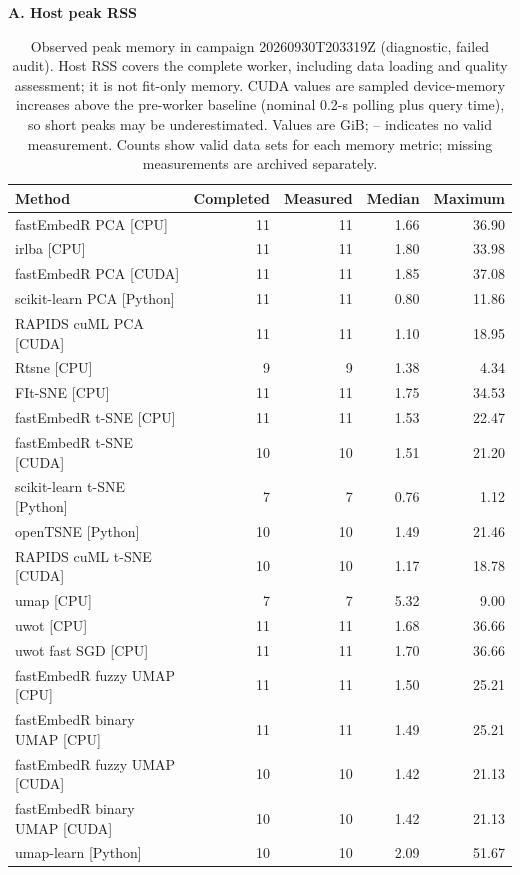 \begin{table}[!htbp]
\centering
\scriptsize
\caption{Observed peak memory in campaign 20260930T203319Z (diagnostic, failed audit). Host RSS covers the complete worker, including data loading and quality assessment; it is not fit-only memory. CUDA values are sampled device-memory increases above the pre-worker baseline (nominal 0.2-s polling plus query time), so short peaks may be underestimated. Values are GiB; -- indicates no valid measurement. Counts show valid data sets for each memory metric; missing measurements are archived separately.}
\label{tab:peak-memory}
\textbf{A. Host peak RSS}\par\smallskip
\begin{tabular}{p{}rrrr}
\toprule
Method & Completed & Measured & Median & Maximum \\
\midrule
fastEmbedR PCA [CPU] & 11 & 11 & 1.66 & 36.90 \\
irlba [CPU] & 11 & 11 & 1.80 & 33.98 \\
fastEmbedR PCA [CUDA] & 11 & 11 & 1.85 & 37.08 \\
scikit-learn PCA [Python] & 11 & 11 & 0.80 & 11.86 \\
RAPIDS cuML PCA [CUDA] & 11 & 11 & 1.10 & 18.95 \\
Rtsne [CPU] & 9 & 9 & 1.38 & 4.34 \\
FIt-SNE [CPU] & 11 & 11 & 1.75 & 34.53 \\
fastEmbedR t-SNE [CPU] & 11 & 11 & 1.53 & 22.47 \\
fastEmbedR t-SNE [CUDA] & 10 & 10 & 1.51 & 21.20 \\
scikit-learn t-SNE [Python] & 7 & 7 & 0.76 & 1.12 \\
openTSNE [Python] & 10 & 10 & 1.49 & 21.46 \\
RAPIDS cuML t-SNE [CUDA] & 10 & 10 & 1.17 & 18.78 \\
umap [CPU] & 7 & 7 & 5.32 & 9.00 \\
uwot [CPU] & 11 & 11 & 1.68 & 36.66 \\
uwot fast SGD [CPU] & 11 & 11 & 1.70 & 36.66 \\
fastEmbedR fuzzy UMAP [CPU] & 11 & 11 & 1.50 & 25.21 \\
fastEmbedR binary UMAP [CPU] & 11 & 11 & 1.49 & 25.21 \\
fastEmbedR fuzzy UMAP [CUDA] & 10 & 10 & 1.42 & 21.13 \\
fastEmbedR binary UMAP [CUDA] & 10 & 10 & 1.42 & 21.13 \\
umap-learn [Python] & 10 & 10 & 2.09 & 51.67 \\

\end{tabular}
\end{table}
